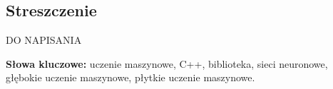 
\subsection*{Streszczenie}

    DO NAPISANIA

\vspace{1cm}
\noindent\textbf{Słowa kluczowe:} uczenie maszynowe, C++, biblioteka, sieci neuronowe, głębokie uczenie maszynowe, płytkie uczenie maszynowe.
